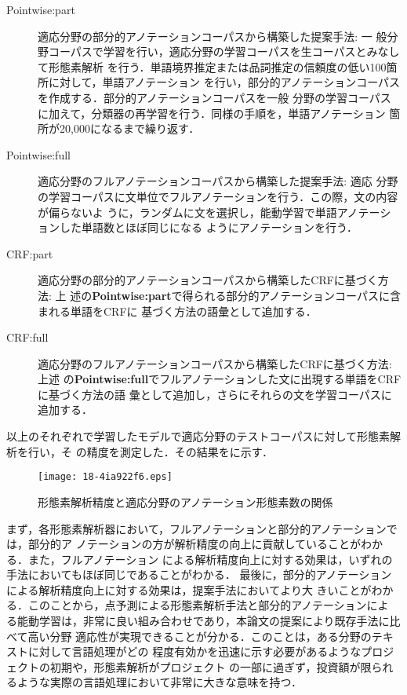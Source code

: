 \documentclass[japanese]{jnlp_1.4}
\def\figref#1{}
\begin{document}
\begin{description}

\item[Pointwise:part] 適応分野の部分的アノテーションコーパスから構築した提案手法: 一
  般分野コーパスで学習を行い，適応分野の学習コーパスを生コーパスとみなして形態素解析
  を行う．単語境界推定または品詞推定の信頼度の低い100箇所に対して，単語アノテーション
  を行い，部分的アノテーションコーパスを作成する．部分的アノテーションコーパスを一般
  分野の学習コーパスに加えて，分類器の再学習を行う．同様の手順を，単語アノテーション
  箇所が20,000になるまで繰り返す．

\item[Pointwise:full] 適応分野のフルアノテーションコーパスから構築した提案手法: 適応
  分野の学習コーパスに文単位でフルアノテーションを行う．この際，文の内容が偏らないよ
  うに，ランダムに文を選択し，能動学習で単語アノテーションした単語数とほぼ同じになる
  ようにアノテーションを行う．

\item[CRF:part] 適応分野の部分的アノテーションコーパスから構築したCRFに基づく方法: 上
  述の{\bf Pointwise:part}で得られる部分的アノテーションコーパスに含まれる単語をCRFに
  基づく方法の語彙として追加する．

\item[CRF:full] 適応分野のフルアノテーションコーパスから構築したCRFに基づく方法: 上述
  の{\bf Pointwise:full}でフルアノテーションした文に出現する単語をCRFに基づく方法の語
  彙として追加し，さらにそれらの文を学習コーパスに追加する．

\end{description}
以上のそれぞれで学習したモデルで適応分野のテストコーパスに対して形態素解析を行い，そ
の精度を測定した．その結果を\figref{figure:res2}に示す．

\begin{figure}[t]
  \begin{center}
\texttt{[image: 18-4ia922f6.eps]}
  \end{center}
  \caption{形態素解析精度と適応分野のアノテーション形態素数の関係}
  \label{figure:res2}
\end{figure}

まず，各形態素解析器において，フルアノテーションと部分的アノテーションでは，部分的ア
ノテーションの方が解析精度の向上に貢献していることがわかる．また，フルアノテーション
による解析精度向上に対する効果は，いずれの手法においてもほぼ同じであることがわかる．
最後に，部分的アノテーションによる解析精度向上に対する効果は，提案手法においてより大
きいことがわかる．このことから，点予測による形態素解析手法と部分的アノテーションによ
る能動学習は，非常に良い組み合わせであり，本論文の提案により既存手法に比べて高い分野
適応性が実現できることが分かる．このことは，ある分野のテキストに対して言語処理がどの
程度有効かを迅速に示す必要があるようなプロジェクトの初期や，形態素解析がプロジェクト
の一部に過ぎず，投資額が限られるような実際の言語処理において非常に大きな意味を持つ．
\end{document}
